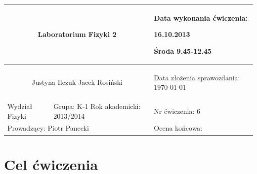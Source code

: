 \documentclass[a4paper,12pt]{article}
\author{Justyna Ilczuk, Jacek Rosiński}
\begin{document}
\begin{center}

    \begin{tabular}{ | m{5cm}| m{5cm} | m{5cm} |}
    \hline 
    \multicolumn{2}{|c|}{{ \Large \textbf{Laboratorium Fizyki 2}} }
    &  
    \begin{center}
    Data wykonania ćwiczenia:
    \end{center}
    \begin{center}
      16.10.2013 
    \end{center}
    \begin{center}
    Środa 9.45-12.45
    \end{center}
     \\ 
    
    \hline
    \multicolumn{2}{|c|}{Justyna Ilczuk \newline Jacek Rosiński}
    & \begin{center}
    {\small Data złożenia sprawozdania:} \newline \today
    \end{center}   \\
   	
   	\hline
    Wydział Fizyki & Grupa: K-1 \newline Rok akademicki: 2013/2014 &    Nr ćwiczenia: 6 \\
   	\hline
   	\multicolumn{2}{|l|}{Prowadzący: Piotr Panecki} & \multicolumn{1}{|l|}{Ocena końcowa:}\\
    \hline
    \end{tabular}
\end{center}

\newpage

\pagestyle{fancy}
\fancyfoot[CO]{\ }
\fancyhead[RO]{\footnotesize{\thepage} }




\section{Cel ćwiczenia}
\end{document}
